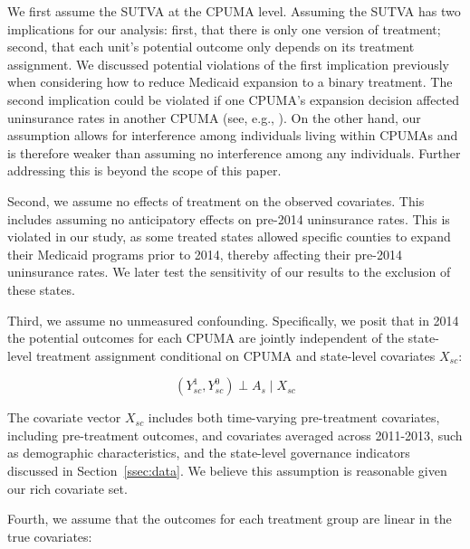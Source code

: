 \documentclass[aoas]{imsart}
\theoremstyle{plain}
\theoremstyle{remark}
\begin{document}
We first assume the SUTVA at the CPUMA level. Assuming the SUTVA has two implications for our analysis: first, that there is only one version of treatment; second, that each unit's potential outcome only depends on its treatment assignment. We discussed potential violations of the first implication previously when considering how to reduce Medicaid expansion to a binary treatment. The second implication could be violated if one CPUMA's expansion decision affected uninsurance rates in another CPUMA (see, e.g., \cite{frean2017premium}). On the other hand, our assumption allows for interference among individuals living within CPUMAs and is therefore weaker than assuming no interference among any individuals. Further addressing this is beyond the scope of this paper.

Second, we assume no effects of treatment on the observed covariates. This includes assuming no anticipatory effects on pre-2014 uninsurance rates. This is violated in our study, as some treated states allowed specific counties to expand their Medicaid programs prior to 2014, thereby affecting their pre-2014 uninsurance rates. We later test the sensitivity of our results to the exclusion of these states.

Third, we assume no unmeasured confounding. Specifically, we posit that in 2014 the potential outcomes for each CPUMA are jointly independent of the state-level treatment assignment conditional on CPUMA and state-level covariates $X_{sc}$:

\begin{equation}\label{eqn:unconfoundedness}
(Y_{sc}^1, Y_{sc}^0) \perp A_s \mid X_{sc} 
\end{equation}

The covariate vector $X_{sc}$ includes both time-varying pre-treatment covariates, including pre-treatment outcomes, and covariates averaged across 2011-2013, such as demographic characteristics, and the state-level governance indicators discussed in Section~\ref{ssec:data}. We believe this assumption is reasonable given our rich covariate set. 

Fourth, we assume that the outcomes for each treatment group are linear in the true covariates:
\end{document}
